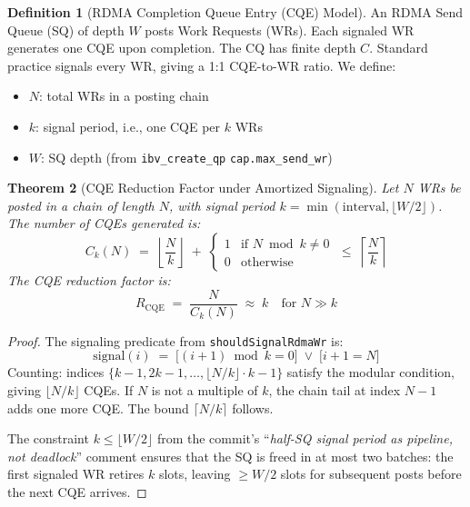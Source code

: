 \documentclass[11pt,a4paper,twoside]{article}
\theoremstyle{plain}
\newtheorem{theorem}{Theorem}[section]
\theoremstyle{definition}
\newtheorem{definition}[theorem]{Definition}
\theoremstyle{remark}
\begin{document}
\begin{definition}[RDMA Completion Queue Entry (CQE) Model]
\label{def:cqe-model}
An RDMA Send Queue (SQ) of depth $W$ posts Work Requests (WRs).  Each signaled WR
generates one CQE upon completion.  The CQ has finite depth $C$.  Standard practice
signals every WR, giving a 1:1 CQE-to-WR ratio.  We define:
\begin{itemize}[nosep]
  \item $N$: total WRs in a posting chain
  \item $k$: signal period, i.e., one CQE per $k$ WRs
  \item $W$: SQ depth (from \texttt{ibv\_create\_qp} \texttt{cap.max\_send\_wr})
\end{itemize}
\end{definition}

\begin{theorem}[CQE Reduction Factor under Amortized Signaling]
\label{thm:cqe-reduction}
Let $N$ WRs be posted in a chain of length $N$, with signal period
$k = \min(\text{interval}, \lfloor W/2 \rfloor)$.  The number of CQEs generated is:
\begin{equation}
  C_k(N) \;=\; \left\lfloor \frac{N}{k} \right\rfloor \;+\;
  \begin{cases} 1 & \text{if } N \bmod k \neq 0 \\ 0 & \text{otherwise} \end{cases}
  \;\leq\; \left\lceil \frac{N}{k} \right\rceil
  \label{eq:cqe-count}
\end{equation}
The CQE reduction factor is:
\begin{equation}
  R_{\text{CQE}} \;=\; \frac{N}{C_k(N)} \;\approx\; k
  \quad\text{for } N \gg k
  \label{eq:cqe-reduction}
\end{equation}
\end{theorem}

\begin{proof}
The signaling predicate from \texttt{shouldSignalRdmaWr} is:
\[
  \text{signal}(i) \;=\; \bigl[(i+1) \bmod k = 0\bigr] \;\lor\; \bigl[i+1 = N\bigr]
\]
Counting: indices $\{k-1, 2k-1, \ldots, \lfloor N/k\rfloor \cdot k - 1\}$ satisfy the
modular condition, giving $\lfloor N/k \rfloor$ CQEs.  If $N$ is not a multiple of $k$,
the chain tail at index $N-1$ adds one more CQE.  The bound $\lceil N/k \rceil$ follows.

The constraint $k \leq \lfloor W/2 \rfloor$ from the commit's
``\textit{half-SQ signal period as pipeline, not deadlock}'' comment ensures that
the SQ is freed in at most two batches: the first signaled WR retires $k$ slots,
leaving $\geq W/2$ slots for subsequent posts before the next CQE arrives.
\end{proof}
\end{document}

